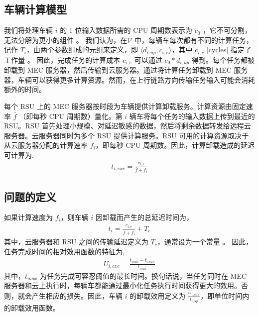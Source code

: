 \subsection{车辆计算模型}\label{section3-2-2}
我们将处理车辆 $i$ 的 1 位输入数据所需的 CPU 周期数表示为 $c_0$ \cite{Zhang2017}，它不可分割，无法分解为更小的组件 \cite{Saleem2021}。
我们认为，在$ \mathcal{V}$ 中，每辆车每次都有不同的计算任务，记作 $T_i$，由两个参数组成的元组来定义，即 $\langle d_{i,up}, c_{i,e}\rangle$，其中 $c_{i,e}$ [cycles] 指定了工作量 \cite{Tran2019}。 因此，完成任务的计算成本 $c_{i,e}$ 可以通过 $c_{0}*d_{i,up}$ 得到。每个任务都被卸载到 MEC 服务器，然后传输到云服务器。通过将计算任务卸载到 MEC 服务器，车辆可以获得更多计算资源。然而，在上行链路方向传输任务输入可能会消耗额外的时间。

每个 RSU 上的 MEC 服务器按时段为车辆提供计算卸载服务。计算资源由固定速率 $\bar{f}$ （即每秒 CPU 周期数）量化。第 $i $ 辆车将每个任务的输入数据上传到最近的 RSU。RSU 首先处理小规模、对延迟敏感的数据，然后将剩余数据转发给远程云服务器。{云服务器同时为多个 RSU 提供计算服务。RSU 可用的计算资源取决于从云服务器分配的计算速率 $f_i$，}即每秒 CPU 周期数。因此，计算卸载造成的延迟可计算为,
\begin{eqnarray}\label{E8}
t_{i,exe}=\frac{c_{i,e}}{\bar{f}+f_i}
\end{eqnarray}
\subsection{问题的定义}\label{section3-2-3}

如果计算速度为 $f_i$，则车辆 $i$ 因卸载而产生的总延迟时间为，
\begin{eqnarray}\label{E9}
 t_i=\frac{c_{i,e}}{\bar{f}+f_i}+T_c
\end{eqnarray}
其中，云服务器和 RSU 之间的传输延迟定义为 $T_c$，通常设为一个常量 \cite{Xiao2020}。 因此，任务完成时间的相对效用函数的特征为,
\begin{eqnarray}\label{E10}
U_{i,exe}=\frac{t_{max}-t_{i,exe}}{t_{max}}
\end{eqnarray}
其中，$t_{max}$ 为{任务完成可容忍阈值的最长时间}。换句话说，当任务同时在 MEC 服务器和云上执行时，每辆车都能通过最小化任务执行时间获得更大的效用。否则，就会产生相应的损失。因此，车辆 $i$ 的卸载效用定义为 $\frac{U_{i,exe}}{t_{i,up}}$，即单位时间内的卸载效用函数。

